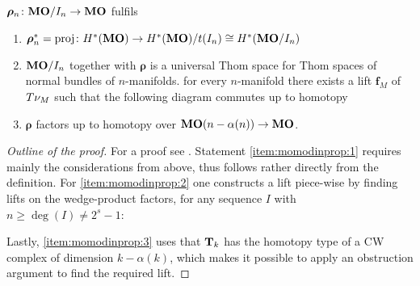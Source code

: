 \begin{Thm*}
  $\bm{\rho}_n\colon\bm{\mathrm{MO}}/I_{n}\to\bm{\mathrm{MO}}$ fulfils 
  \begin{enumerate}
  \item\label{item:momodinprop:1}
    ${\bm{\rho}}^*_n=\mathrm{proj}\colon
    H^*(\bm{\mathrm{MO}})
    \to H^*(\bm{\mathrm{MO}})/t(I_{n})\cong H^*(\bm{\mathrm{MO}}/I_{n})$
  \item\label{item:momodinprop:2}
    $\bm{\mathrm{MO}}/I_{n}$ together with $\bm{\rho}$ is a universal Thom space
    for Thom spaces of normal bundles of $n$-manifolds.
    \Idest for every $n$-manifold there exists a lift $\bm{f}_M$ of
    $T{\nu_{M}}$ 
    such that the following diagram commutes up to homotopy
    \begin{center}
    \end{center}
  \item\label{item:momodinprop:3}
    $\bm{\rho}$ factors up to homotopy over
    $\bm{\mathrm{MO}}(n-\alpha(n))\to\bm{\mathrm{MO}}$.
  \end{enumerate}
  \begin{proof}[Outline of the proof]
    For a proof see \cite[Lemma~2.28, Theorem~2.29]{immersionconj}.
    Statement \ref{item:momodinprop:1} requires mainly the
    considerations from above, thus follows rather directly from the
    definition.
    For \ref{item:momodinprop:2} one constructs a lift piece-wise by
    finding lifts on the wedge-product factors, \idest for any
    sequence $I$ with $n\geq\deg(I)\neq2^s-1$:
    \begin{center}
    \end{center}
    Lastly, \ref{item:momodinprop:3} uses that $\bm{\mathrm{T}}{}_{k}$ has
    the homotopy type of a CW complex of dimension $k-\alpha(k)$,
    which makes it possible to apply an obstruction argument to find
    the required lift.
  \end{proof}
\end{Thm*}

